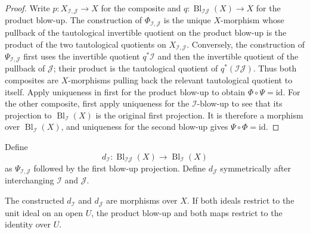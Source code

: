 \begin{proof}
  Write $p\colon X_{\mathcal I,\mathcal J}\to X$ for the composite and
  $q\colon\operatorname{Bl}_{\mathcal I\mathcal J}(X)\to X$ for the
  product blow-up.  The construction of $\Phi_{\mathcal I,\mathcal J}$ is
  the unique $X$-morphism whose pullback of the tautological invertible
  quotient on the product blow-up is the product of the two tautological
  quotients on $X_{\mathcal I,\mathcal J}$.  Conversely, the construction of
  $\Psi_{\mathcal I,\mathcal J}$ first uses the invertible quotient
  $q^*\mathcal I$ and then the invertible quotient of the pullback of
  $\mathcal J$; their product is the tautological quotient of
  $q^*(\mathcal I\mathcal J)$.  Thus both composites are $X$-morphisms
  pulling back the relevant tautological quotient to itself.  Apply uniqueness
  in  first for the product
  blow-up to obtain $\Phi\circ\Psi=\mathrm{id}$.  For the other composite,
  first apply uniqueness for the $\mathcal I$-blow-up to see that its
  projection to $\operatorname{Bl}_{\mathcal I}(X)$ is the original first
  projection.  It is therefore a morphism over
  $\operatorname{Bl}_{\mathcal I}(X)$, and uniqueness for the second blow-up
  gives $\Psi\circ\Phi=\mathrm{id}$.
\end{proof}

\begin{definition}
  \label{def:nagata-blowup-product-domination-maps}

  Define
  \[
    d_{\mathcal I}\colon\operatorname{Bl}_{\mathcal I\mathcal J}(X)
      \longrightarrow\operatorname{Bl}_{\mathcal I}(X)
  \]
  as $\Psi_{\mathcal I,\mathcal J}$ followed by the first blow-up
  projection.  Define $d_{\mathcal J}$ symmetrically after interchanging
  $\mathcal I$ and $\mathcal J$.
\end{definition}

\begin{corollary}
  \label{cor:nagata-blowup-product-common-refinement}

  The constructed $d_{\mathcal I}$ and $d_{\mathcal J}$ are morphisms over
  $X$.  If both ideals restrict to the unit ideal on an open $U$, the product
  blow-up and both maps restrict to the identity over $U$.
\end{corollary}

